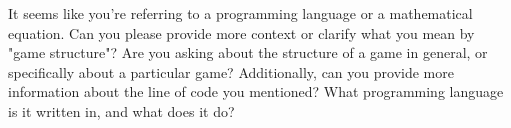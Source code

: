 It seems like you're referring to a programming language or a mathematical equation. Can you please provide more context or clarify what you mean by "game structure"? Are you asking about the structure of a game in general, or specifically about a particular game? Additionally, can you provide more information about the line of code you mentioned? What programming language is it written in, and what does it do?